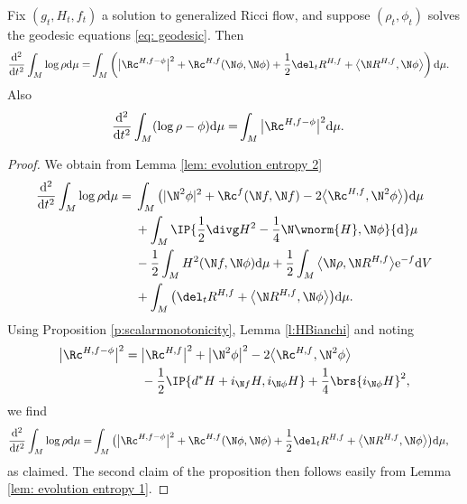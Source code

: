 \begin{prop} \label{prop:entropyconvexity} Fix $(g_t, H_t, f_t)$ a solution to generalized Ricci flow, and suppose $(\rho_t,\phi_t)$ solves the geodesic equations \eqref{eq: geodesic}. Then
 \begin{align*}
	\frac{{\rm d}^2}{{\rm d}t^2}\int_M \log\rho {\rm d}\mu
	=&\int_M \left(\big|\Rc^{H,f-\phi}\big|^2 + \Rc^{H,f}(\N\phi,\N\phi)+\frac12\del_t R^{H,f}+\big\langle\N R^{H,f},\N\phi\big\rangle \right) {\rm d}\mu.
	\end{align*}
 Also
	\begin{align*}
	\frac{{\rm d}^2}{{\rm d}t^2}\int_M (\log\rho-\phi) {\rm d}\mu
	=&\int_M \big|\Rc^{H,f-\phi}\big|^2 {\rm d}\mu.
	\end{align*}
\end{prop}
\begin{proof}
We obtain from Lemma \ref{lem: evolution entropy 2}
\begin{align*}
 \frac{{\rm d}^2}{{\rm d}t^2}\int_M \log\rho {\rm d}\mu={}&\int_M \big(|\N^2\phi|^2+\Rc^f(\N f,\N f)-2\big\langle\Rc^{H,f},\N^2\phi\big\rangle \big) {\rm d}\mu\\
	&+\int_M \IP{\frac12\divg H^2-\frac1{4}\N\wnorm{H},\N\phi} {\rm d}\mu\\
	&-\frac12\int_M H^2(\N f,\N\phi) {\rm d}\mu+\frac12\int_M \big\langle\N\rho,\N R^{H,f}\big\rangle{\rm e}^{-f} {\rm d}V\\
	&+\int_M \big(\del_t R^{H,f}+\big\langle\N R^{H,f},\N \phi\big\rangle \big) {\rm d}\mu.
\end{align*}
Using Proposition \ref{p:scalarmonotonicity}, Lemma \ref{l:HBianchi} and noting
\begin{align*}
	\big|\Rc^{H,f-\phi}\big|^2={}&\big|\Rc^{H,f}\big|^2+ \big|\N^2\phi\big|^2-2\big\langle\Rc^{H,f},\N^2\phi\big\rangle
	\\&-\frac12\IP{d^*H+i_{\N f}H,i_{\N\phi}H}+\frac14 \brs{i_{\N\phi}H}^2,
	\end{align*}
 we find
 \begin{align*}
 \frac{{\rm d}^2}{{\rm d}t^2}\int_M \log\rho {\rm d}\mu
	=&\int_M \big(\big|\Rc^{H,f-\phi}\big|^2 + \Rc^{H,f}(\N\phi,\N\phi)+\frac12\del_t R^{H,f}+\big\langle\N R^{H,f},\N\phi\big\rangle \big) {\rm d}\mu,
\end{align*}
as claimed. The second claim of the proposition then follows easily from Lemma \ref{lem: evolution entropy 1}.
\end{proof}
